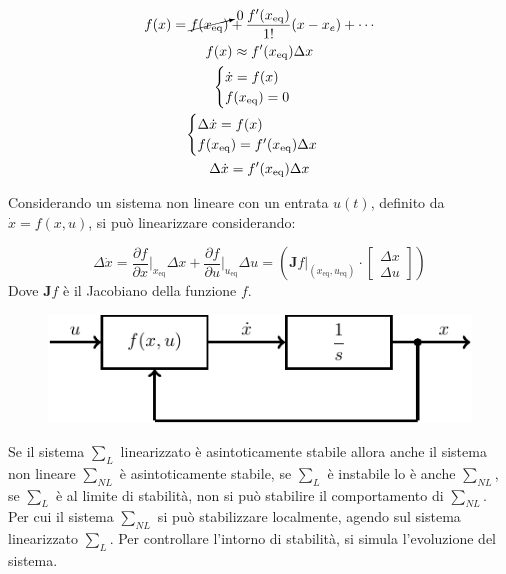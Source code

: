 \documentclass{article}
\numberwithin{equation}{subsection}
\begin{document}
\begin{gather*}
    f(x)=\cancelto{0}{f(x_\mathrm{eq})}+\displaystyle\frac{f'(x_\mathrm{eq})}{1!}{(x-x_e)}+\cdots\\
    f(x)\approx f'(x_\mathrm{eq})\Delta x\\
    \begin{cases}
        \dot x=f(x)\\
        f(x_\mathrm{eq})=0
    \end{cases}\\
    \begin{cases}
        \Delta\dot x=f(x)\\
        f(x_\mathrm{eq})=f'(x_\mathrm{eq})\Delta x
    \end{cases}\\
    \Delta\dot x=f'(x_\mathrm{eq})\Delta x
\end{gather*}

Considerando un sistema non lineare con un entrata $u(t)$, definito da $\dot x=f(x,u)$, si può linearizzare considerando: 

\begin{equation*}
    \Delta\dot x=\displaystyle\frac{\partial f}{\partial x}\bigg|_{x_\mathrm{eq}}\Delta x+\frac{\partial f}{\partial u}\bigg|_{u_\mathrm{eq}}\Delta u=\left(\mathbf{J}f\bigg|_{(x_\mathrm{eq},u_\mathrm{eq})}\cdot
    \begin{bmatrix}
        \Delta x\\
        \Delta u
    \end{bmatrix}
    \right)
\end{equation*}
Dove $\mathbf{J}f$ è il Jacobiano della funzione $f$. 

\begin{figure}[H]%
    \centering
    \includegraphics{linearizzazione.pdf}%
\end{figure}

Se il sistema $\sum_L$ linearizzato è asintoticamente stabile allora anche il sistema non lineare $\sum_{NL}$ è asintoticamente stabile, se $\sum_L$ è instabile lo è 
anche $\sum_{NL}$, se $\sum_L$ è al limite di stabilità, non si può stabilire il comportamento di $\sum_{NL}$. Per cui il sistema $\sum_{NL}$ si può stabilizzare 
localmente, agendo sul sistema linearizzato $\sum_L$. Per controllare l'intorno di stabilità, si simula l'evoluzione del sistema. 
\end{document}
